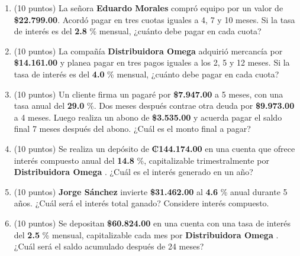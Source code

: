 \documentclass[10pt]{article}
\begin{document}
\begin{enumerate}[leftmargin=*, label=\textbf{\arabic*.}]
  \item (10 puntos) La señora \textbf{ Eduardo Morales } compró equipo por un valor de \textbf{\$\num{ 22,799.00 }}. Acordó pagar en tres cuotas iguales a 4, 7 y 10 meses. Si la tasa de interés es del \textbf{ 2.8 }\% mensual, ¿cuánto debe pagar en cada cuota?

  \vspace{0.5cm}

  \item (10 puntos) La compañía \textbf{ Distribuidora Omega } adquirió mercancía por \textbf{\$\num{ 14,161.00 }} y planea pagar en tres pagos iguales a los 2, 5 y 12 meses. Si la tasa de interés es del \textbf{ 4.0 }\% mensual, ¿cuánto debe pagar en cada cuota?

  \vspace{0.5cm}

  \item (10 puntos) Un cliente firma un pagaré por \textbf{\$\num{ 7,947.00 }} a 5 meses, con una tasa anual del \textbf{ 29.0 }\%. Dos meses después contrae otra deuda por \textbf{\$\num{ 9,973.00 }} a 4 meses. Luego realiza un abono de \textbf{\$\num{ 3,535.00 }} y acuerda pagar el saldo final 7 meses después del abono. ¿Cuál es el monto final a pagar?

  \vspace{0.5cm}

  \item (10 puntos) Se realiza un depósito de \textbf{₡\num{ 144.174.00 }} en una cuenta que ofrece interés compuesto anual del \textbf{ 14.8 }\%, capitalizable trimestralmente por \textbf{ Distribuidora Omega }. ¿Cuál es el interés generado en un año?

  \vspace{0.5cm}

  \item (10 puntos) \textbf{ Jorge Sánchez } invierte \textbf{\$\num{ 31,462.00 }} al \textbf{ 4.6 }\% anual durante 5 años. ¿Cuál será el interés total ganado? Considere interés compuesto.

  \vspace{0.5cm}

  \item (10 puntos) Se depositan \textbf{\$\num{ 60,824.00 }} en una cuenta con una tasa de interés del \textbf{ 2.5 }\% mensual, capitalizable cada mes por \textbf{ Distribuidora Omega }. ¿Cuál será el saldo acumulado después de 24 meses?
\end{enumerate}
\end{document}
